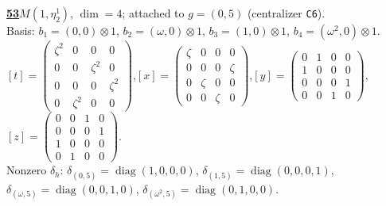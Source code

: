 \begin{samepage}\noindent\textbf{\underline{53}}\quad $M(1,\eta^{1}_{2})$, $\dim=4$; attached to $g=(0,5)$ (centralizer \texttt{C6}).\\
Basis: $b_{1}=(0,0)\otimes 1$, $b_{2}=(\omega,0)\otimes 1$, $b_{3}=(1,0)\otimes 1$, $b_{4}=(\omega^2,0)\otimes 1$.\\
$[t]=\left(\begin{smallmatrix} \zeta^2 & 0 & 0 & 0 \\ 0 & 0 & \zeta^2 & 0 \\ 0 & 0 & 0 & \zeta^2 \\ 0 & \zeta^2 & 0 & 0 \end{smallmatrix}\right)$,\quad $[x]=\left(\begin{smallmatrix} \zeta & 0 & 0 & 0 \\ 0 & 0 & 0 & \zeta \\ 0 & \zeta & 0 & 0 \\ 0 & 0 & \zeta & 0 \end{smallmatrix}\right)$,\quad $[y]=\left(\begin{smallmatrix} 0 & 1 & 0 & 0 \\ 1 & 0 & 0 & 0 \\ 0 & 0 & 0 & 1 \\ 0 & 0 & 1 & 0 \end{smallmatrix}\right)$,\quad $[z]=\left(\begin{smallmatrix} 0 & 0 & 1 & 0 \\ 0 & 0 & 0 & 1 \\ 1 & 0 & 0 & 0 \\ 0 & 1 & 0 & 0 \end{smallmatrix}\right)$.\\
Nonzero $\delta_h$: $\delta_{(0,5)}=\operatorname{diag}(1,0,0,0)$, $\delta_{(1,5)}=\operatorname{diag}(0,0,0,1)$, $\delta_{(\omega,5)}=\operatorname{diag}(0,0,1,0)$, $\delta_{(\omega^2,5)}=\operatorname{diag}(0,1,0,0)$.\end{samepage}
\medskip

